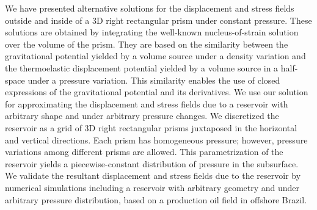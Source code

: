 \documentclass[P]{BrJG_submit}
\begin{document}
\begin{resumo}
We have presented alternative solutions for the displacement and stress fields outside and inside of a 3D right rectangular prism  under constant pressure. These solutions are obtained by integrating the well-known nucleus-of-strain solution over the volume of the prism. They are based on the similarity between the gravitational potential yielded by a volume source under a density variation and the thermoelastic displacement potential yielded by a volume source in a half-space under a pressure variation. This similarity enables the use of closed expressions of the gravitational potential 
and its derivatives. We use our solution for approximating the displacement and stress fields
due to a reservoir with arbitrary shape and under arbitrary pressure changes.
We discretized the reservoir as a grid of 3D right rectangular prisms  juxtaposed in the horizontal and vertical directions. Each prism has homogeneous pressure; however, pressure variations among different prisms are allowed.  This parametrization of the reservoir yields a piecewise-constant distribution of pressure in the subsurface.  We validate the resultant displacement and stress fields due to the reservoir by numerical simulations including a reservoir with arbitrary geometry and under arbitrary pressure distribution, based on a production oil field in offshore Brazil.
\end{resumo}
\end{document}

